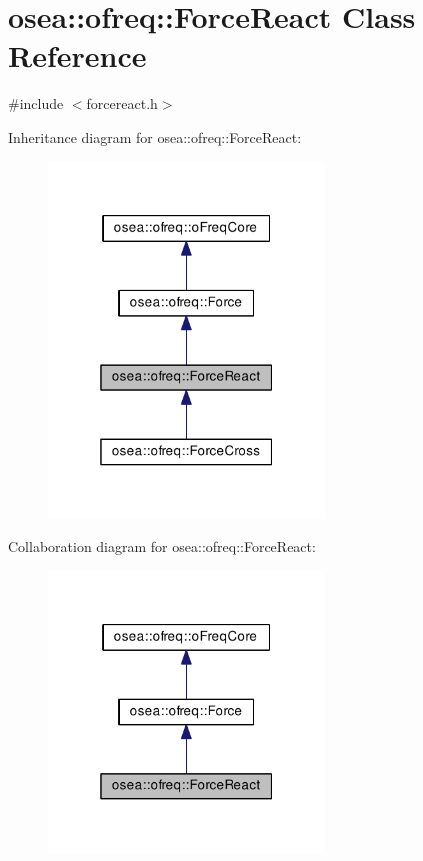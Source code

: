\hypertarget{classosea_1_1ofreq_1_1_force_react}{\section{osea\-:\-:ofreq\-:\-:Force\-React Class Reference}
\label{classosea_1_1ofreq_1_1_force_react}
}


{\ttfamily \#include $<$forcereact.\-h$>$}



Inheritance diagram for osea\-:\-:ofreq\-:\-:Force\-React\-:
\nopagebreak
\begin{figure}[H]
\begin{center}
\leavevmode
\includegraphics[width=208pt]{classosea_1_1ofreq_1_1_force_react__inherit__graph}
\end{center}
\end{figure}


Collaboration diagram for osea\-:\-:ofreq\-:\-:Force\-React\-:
\nopagebreak
\begin{figure}[H]
\begin{center}
\leavevmode
\includegraphics[width=208pt]{classosea_1_1ofreq_1_1_force_react__coll__graph}
\end{center}
\end{figure}
